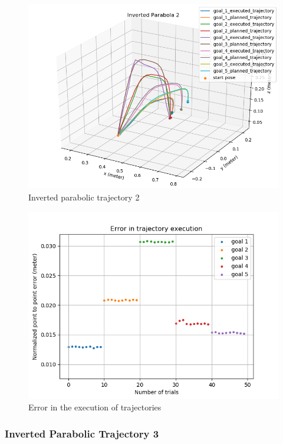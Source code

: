 \begin{figure}[H]
	\centering
	\includegraphics[scale=0.60]{images/1/inv_par_2.png}
	\caption{Inverted parabolic trajectory 2}
	\label{fig:inv_par_2}
\end{figure}


\begin{figure}[H]
	\centering
	\includegraphics[scale=0.65]{images/1/inv_par_2_e.png}
	\caption{Error in the execution of trajectories}
	\label{fig:inv_par_2_e}
\end{figure}

\subsubsection{Inverted Parabolic Trajectory 3}


